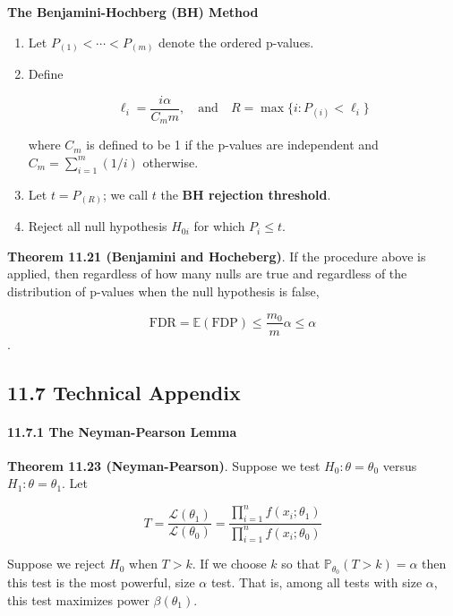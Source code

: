 \textbf{The Benjamini-Hochberg (BH) Method}

\begin{enumerate}[label={\arabic*.}]
\item
  Let \(P_{(1)} < \cdots < P_{(m)}\) denote the ordered p-values.
\item
  Define

\[\ell_i = \frac{i \alpha}{C_m m},
\quad \text{and} \quad
R = \max \bigg\{ i: P_{(i)} < \ell_i \bigg\}\]

where \(C_m\) is defined to be 1 if the p-values are independent and
\(C_m = \sum_{i=1}^m (1/i)\) otherwise.
\end{enumerate}

\begin{enumerate}[label={\arabic*.}]
\setcounter{enumi}{2}
\item
  Let \(t = P_{(R)}\); we call \(t\) the \textbf{BH rejection
  threshold}.
\item
  Reject all null hypothesis \(H_{0i}\) for which \(P_i \leq t\).
\end{enumerate}

\textbf{Theorem 11.21 (Benjamini and Hocheberg)}. If the procedure above
is applied, then regardless of how many nulls are true and regardless of
the distribution of p-values when the null hypothesis is false,

\[\text{FDR} = \mathbb{E}(\text{FDP}) \leq \frac{m_0}{m} \alpha \leq \alpha \].

\subsection{11.7 Technical Appendix}\label{technical-appendix}

\paragraph{11.7.1 The Neyman-Pearson
Lemma}\label{the-neyman-pearson-lemma}

\textbf{Theorem 11.23 (Neyman-Pearson)}. Suppose we test
\(H_0: \theta = \theta_0\) versus \(H_1: \theta = \theta_1\). Let

\[ T = \frac{\mathcal{L}(\theta_1)}{\mathcal{L}(\theta_0)} = \frac{\prod_{i=1}^n f(x_i; \theta_1)}{\prod_{i=1}^n f(x_i; \theta_0)}\]

Suppose we reject \(H_0\) when \(T > k\). If we choose \(k\) so that
\(\mathbb{P}_{\theta_0}(T > k) = \alpha\) then this test is the most
powerful, size \(\alpha\) test. That is, among all tests with size
\(\alpha\), this test maximizes power \(\beta(\theta_1)\).

